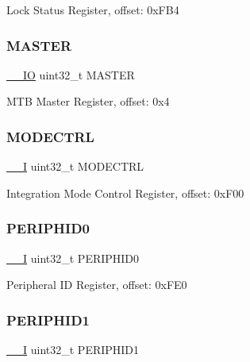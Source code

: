 Lock Status Register, offset\+: 0x\+F\+B4 \mbox{\label{struct_m_t_b___type_acc1a632d91e654ed519f8a5baa954733}} 
\subsubsection{\texorpdfstring{MASTER}{MASTER}}
{\footnotesize\ttfamily \mbox{\hyperlink{core__cm0plus_8h_aec43007d9998a0a0e01faede4133d6be}{\+\_\+\+\_\+\+IO}} uint32\+\_\+t M\+A\+S\+T\+ER}

M\+TB Master Register, offset\+: 0x4 \mbox{\label{struct_m_t_b___type_a22ddc096f121ce961c24976be80cacba}} 
\subsubsection{\texorpdfstring{MODECTRL}{MODECTRL}}
{\footnotesize\ttfamily \mbox{\hyperlink{core__cm0plus_8h_af63697ed9952cc71e1225efe205f6cd3}{\+\_\+\+\_\+I}} uint32\+\_\+t M\+O\+D\+E\+C\+T\+RL}

Integration Mode Control Register, offset\+: 0x\+F00 \mbox{\label{struct_m_t_b___type_abccabeeb775d571ffd814f5d21937eab}} 
\subsubsection{\texorpdfstring{PERIPHID0}{PERIPHID0}}
{\footnotesize\ttfamily \mbox{\hyperlink{core__cm0plus_8h_af63697ed9952cc71e1225efe205f6cd3}{\+\_\+\+\_\+I}} uint32\+\_\+t P\+E\+R\+I\+P\+H\+I\+D0}

Peripheral ID Register, offset\+: 0x\+F\+E0 \mbox{\label{struct_m_t_b___type_a16ec4a15479493f070d74c29f4e244c5}} 
\subsubsection{\texorpdfstring{PERIPHID1}{PERIPHID1}}
{\footnotesize\ttfamily \mbox{\hyperlink{core__cm0plus_8h_af63697ed9952cc71e1225efe205f6cd3}{\+\_\+\+\_\+I}} uint32\+\_\+t P\+E\+R\+I\+P\+H\+I\+D1}

